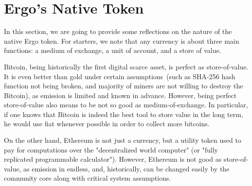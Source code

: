 \section{Ergo's Native Token}




 In this section, we are going to provide some reflections on the nature of the native Ergo token. For starters, we note that
 any currency is about three main functions: a medium of exchange, a unit of account, and a store of value.

 Bitcoin, being historically the first digital scarce asset, is perfect as store-of-value. It is even better than
 gold under certain assumptions~(such as SHA-256 hash function not being broken, and majority of miners are not willing
 to destroy the Bitcoin), as emission is limited and known in advance. However, being perfect store-of-value also means
 to be not so good as medium-of-exchange. In particular, if one knows that Bitcoin is indeed the best tool to store
 value in the long term, he would use fiat whenever possible in order to collect more bitcoins.

 On the other hand, Ethereum is not just a currency, but a utility token used to pay for computations over the
 "decentralized world computer" (or "fully replicated programmable calculator"). However, Ethereum is not good as
 store-of-value, as emission in endless, and, historically, can be changed easily by the community core along with
 critical system assumptions.

